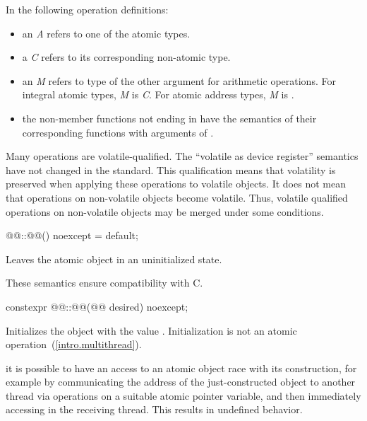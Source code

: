 \pnum
In the following operation definitions:

\begin{itemize}
\item  an \textit{A} refers to one of the atomic types.
\item a \textit{C} refers to its corresponding non-atomic type.
\item an \textit{M} refers to type of the other argument for arithmetic operations. For
integral atomic types, \textit{M} is \textit{C}. For atomic address types, \textit{M} is
.
\item the non-member functions not ending in  have the semantics of their
corresponding  functions with  arguments of
.
\end{itemize}

\pnum
\begin{note} Many operations are volatile-qualified. The ``volatile as device register''
semantics have not changed in the standard. This qualification means that volatility is
preserved when applying these operations to volatile objects. It does not mean that
operations on non-volatile objects become volatile. Thus, volatile qualified operations
on non-volatile objects may be merged under some conditions. \end{note}

%
\begin{itemdecl}
@@::@@() noexcept = default;
\end{itemdecl}

\begin{itemdescr}
\pnum
\effects
Leaves the atomic object in an uninitialized state.
\begin{note}
These semantics ensure compatibility with C.
\end{note}
\end{itemdescr}

%
\begin{itemdecl}
constexpr @@::@@(@@ desired) noexcept;
\end{itemdecl}

\begin{itemdescr}
\pnum
\effects Initializes the object with the value .
Initialization is not an atomic operation~(\ref{intro.multithread}).
\begin{note} it is possible to have an access to an atomic object 
race with its construction, for example by communicating the address of the
just-constructed object  to another thread via
 operations on a suitable atomic pointer
variable, and then immediately accessing  in the receiving thread.
This results in undefined behavior. \end{note}
\end{itemdescr}

